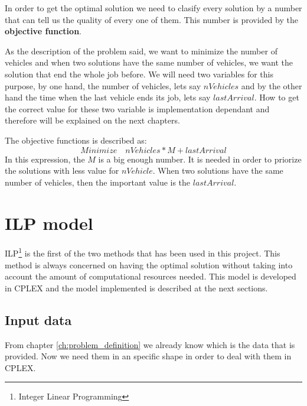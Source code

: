 \documentclass[]{report}
\begin{document}
In order to get the optimal solution we need to clasify every solution by a number that can tell us the quality of every one of them. This number is provided by the \textbf{objective function}.

As the description of the problem said, we want to minimize the number of vehicles and when two solutions have the same number of vehicles, we want the solution that end the whole job before. We will need two variables for this purpose, by one hand, the number of vehicles, lets say $nVehicles$ and by the other hand the time when the last vehicle ends its job, lets say $lastArrival$. How to get the correct value for these two variable is implementation dependant and therefore will be explained on the next chapters.

The objective functions is described as:
$$ Minimize \quad nVehicles*M + lastArrival$$
In this expression, the $M$ is a big enough number. It is needed in order to priorize the solutions with less value for $nVehicle$. When two solutions have the same number of vehicles, then the important value is the $lastArrival$.


\chapter{ILP model}\label{ch:ilp_model}

ILP\footnote{Integer Linear Programming} is the first of the two methods that has been used in this project. This method is always concerned on having the optimal solution without taking into account the amount of computational resources needed. This model is developed in CPLEX and the model implemented is described at the next sections.

\section{Input data}

From chapter \ref{ch:problem_definition} we already know which is the data that is provided. Now we need them in an specific shape in order to deal with them in CPLEX.
\end{document}
